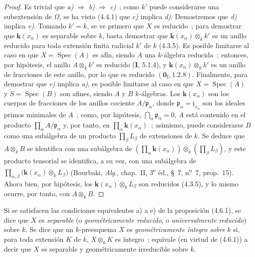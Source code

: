 \begin{proof}
Es trivial que \emph{a)} $\Rightarrow$ \emph{b)} $\Rightarrow$ \emph{c)}~; como $k'$ puede
considerarse una subextensión de $\Omega$, se ha visto (4.4.1) que \emph{c)} implica
\emph{d)}. Demostremos que \emph{d)} implica \emph{e)}. Tomando $k'=k$, se ve primero que $X$ es
reducido~; para demostrar que $\boldsymbol{k}(x_\alpha)$ es separable sobre $k$, basta
demostrar que $\boldsymbol{k}(x_\alpha)\otimes_k k'$ es un anillo reducido para toda extensión
finita radicial $k'$ de $k$ (4.3.5). Es posible limitarse al caso en que
$X=\operatorname{Spec}(A)$ es afín, siendo $A$ una $k$-álgebra reducida~;
entonces, por hipótesis, el anillo $A\otimes_k k'$ es reducido (\textbf I, 5.1.4), y
$\boldsymbol{k}(x_\alpha)\otimes_k k'$ es un anillo de fracciones de este anillo, por lo que
es reducido $(\mathbf{0}_{\mathrm I},1.2.8)$. Finalmente, para demostrar que \emph{e)} implica
\emph{a)}, es posible limitarse al caso en que $X=\operatorname{Spec}(A)$ y
$S=\operatorname{Spec}(B)$ son afines, siendo $A$ y $B$ $k$-álgebras. Los
$\boldsymbol{k}(x_\alpha)$ son los cuerpos de fracciones de los anillos cociente
$A/\mathfrak p_\alpha$, donde $\mathfrak p_\alpha=\mathfrak j_{x_\alpha}$ son los
ideales primos minimales de $A$~; como, por hipótesis,
$\bigcap_\alpha\mathfrak p_\alpha=0$, $A$ está contenido en el producto
$\prod_\alpha A/\mathfrak p_\alpha$ y, por tanto, en
$\prod_\alpha \boldsymbol{k}(x_\alpha)$~; asimismo, puede considerarse $B$ como una
subálgebra de un producto $\prod_\beta L_\beta$ de extensiones de $k$. Se deduce
que $A\otimes_k B$ se identifica con una subálgebra de
$\left(\prod_\alpha \boldsymbol{k}(x_\alpha)\right)\otimes_k
\left(\prod_\beta L_\beta\right)$,
y este producto tensorial se identifica, a su vez, con una subálgebra de
$\prod_{\alpha,\beta}\bigl(\boldsymbol{k}(x_\alpha)\otimes_k L_\beta\bigr)$
(Bourbaki, \emph{Alg.}, chap.~II, 3\textsuperscript{e} éd., \S~7,
n\textsuperscript{o}~7, prop.~15). Ahora bien, por hipótesis, los
$\boldsymbol{k}(x_\alpha)\otimes_k L_\beta$ son reducidos (4.3.5), y lo mismo ocurre, por
tanto, con $A\otimes_k B$.
\end{proof}

\begin{definition}[4.6.2]
\label{IV.2.4.6.2-fr}
Si se satisfacen las condiciones equivalentes \textup{a)} a \textup{e)} de la proposición
\textup{(4.6.1)}, se dice que $X$ es \emph{separable} (o \emph{geométricamente reducido},
o \emph{universalmente reducido}) \textup{sobre} $k$. Se dice que un $k$-preesquema $X$
es \emph{geométricamente íntegro sobre} $k$ si, para toda extensión $K$ de $k$,
$X\otimes_k K$ es íntegro~; equivale (en virtud de \textup{(4.6.1)}) a decir que $X$ es
separable y geométricamente irreducible sobre $k$.
\end{definition}

